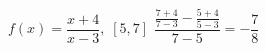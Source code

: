 {$f(x) = \dfrac{x + 4}{x - 3}, \; [5, 7]$}
{$\dfrac{\frac{7 + 4}{7 - 3} - \frac{5 + 4}{5 - 3}}{7 - 5} = -\dfrac{7}{8}$ }